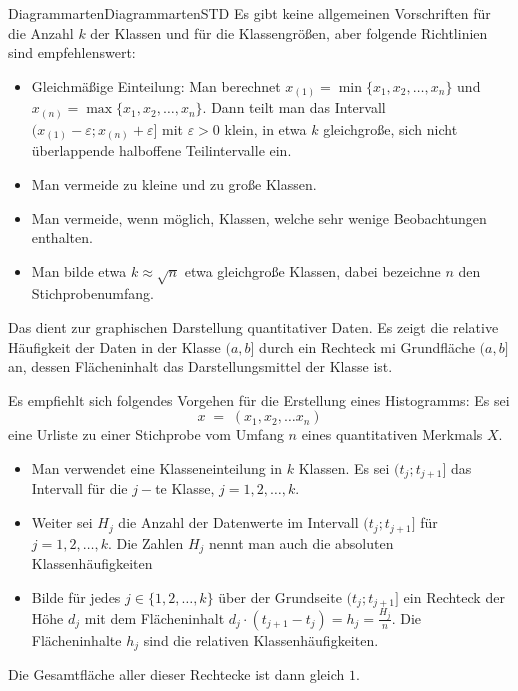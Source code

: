 \begin{MXContent}{Diagrammarten}{Diagrammarten}{STD}
Es gibt keine allgemeinen Vorschriften für die Anzahl $k$ der Klassen und für die Klassengrößen, aber folgende
Richtlinien sind empfehlenswert:
\begin{itemize}
\item{Gleichmäßige Einteilung: Man berechnet $x_{(1)}=\min\lbrace x_{1},x_{2},\ldots ,x_{n}\rbrace$ und $x_{(n)}=\max\lbrace x_{1},x_{2},\ldots ,x_{n}\rbrace$.
Dann teilt man das Intervall $(x_{(1)}-\varepsilon;x_{(n)}+\varepsilon]$ mit $\varepsilon >0$ klein,
in etwa $k$ gleichgroße, sich nicht überlappende halboffene Teilintervalle ein.}
\item{Man vermeide zu kleine und zu große Klassen.}
\item{Man vermeide, wenn möglich, Klassen, welche sehr wenige Beobachtungen enthalten.}
\item{Man bilde etwa $k\approx \sqrt{n}$ etwa gleichgroße Klassen, dabei bezeichne $n$ den Stichprobenumfang.}
\end{itemize}

\begin{MInfo}
Das  dient zur graphischen Darstellung quantitativer Daten.
Es zeigt die relative Häufigkeit der Daten in der Klasse $(a,b]$ durch ein Rechteck mi Grundfläche $(a,b]$ an, dessen Flächeninhalt das Darstellungsmittel der Klasse ist.
\end{MInfo}

Es empfiehlt sich folgendes Vorgehen für die Erstellung eines Histogramms:
Es sei
$$
x\;=\; (x_{1},x_{2},\ldots x_{n})
$$
eine Urliste zu einer Stichprobe vom Umfang $n$ eines quantitativen Merkmals $X$.
\begin{itemize}
\item{Man verwendet eine Klasseneinteilung in $k$ Klassen. Es sei $(t_{j};t_{j+1}]$ das Intervall für die $j-$te Klasse, $j=1,2,\ldots ,k$.}
\item{Weiter sei $H_{j}$ die Anzahl der Datenwerte im Intervall $(t_{j};t_{j+1}]$ für $j=1,2,\ldots ,k$.
Die Zahlen $H_{j}$ nennt man auch die absoluten Klassenhäufigkeiten}
\item{Bilde für jedes $j\in \{1,2,\ldots ,k\}$ über der Grundseite $(t_{j};t_{j+1}]$ ein Rechteck der Höhe $d_{j}$ mit dem Flächeninhalt
$d_{j}\cdot (t_{j+1}-t_{j})=h_{j}=\frac{H_{j}}{n}$. Die Flächeninhalte $h_{j}$ sind die relativen Klassenhäufigkeiten.}
\end{itemize}

Die Gesamtfläche aller dieser Rechtecke ist dann gleich $1$.


\end{MXContent}
